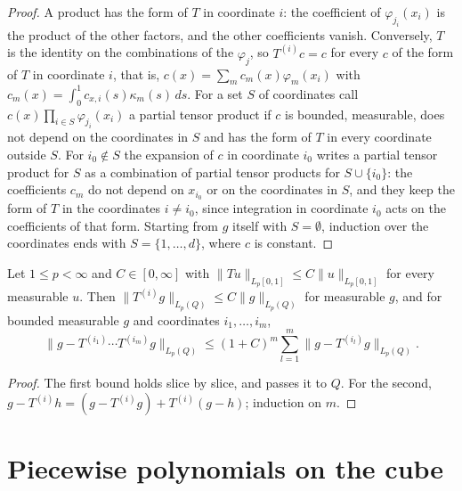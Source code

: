 \begin{proof}
\leanok
A product has the form of $T$ in coordinate $i$: the coefficient of $\varphi_{j_i}(x_i)$ is the
product of the other factors, and the other coefficients vanish. Conversely, $T$ is the identity
on the combinations of the $\varphi_j$, so $T^{(i)} c = c$ for every $c$ of the form of $T$ in
coordinate $i$, that is,
$c(x) = \sum_m c_m(x) \varphi_m(x_i)$ with $c_m(x) = \int_0^1 c_{x,i}(s) \kappa_m(s) \, ds$. For a
set $S$ of coordinates call $c(x) \prod_{i \in S} \varphi_{j_i}(x_i)$ a partial tensor product if
$c$ is bounded, measurable, does not depend on the coordinates in $S$ and has the form of $T$ in
every coordinate outside $S$. For $i_0 \notin S$ the expansion of $c$ in coordinate $i_0$ writes a
partial tensor product for $S$ as a combination of partial tensor products for $S \cup \{i_0\}$:
the coefficients $c_m$ do not depend on $x_{i_0}$ or on the coordinates in $S$, and they keep the
form of $T$ in the coordinates $i \neq i_0$, since integration in coordinate $i_0$ acts on the
coefficients of that form. Starting from $g$ itself with $S = \emptyset$, induction over the
coordinates ends with $S = \{1, \dots, d\}$, where $c$ is constant.
\end{proof}

\begin{lemma}
\label{lem:kernel-telescoping}
\leanok
{}
Let $1 \leq p < \infty$ and $C \in [0, \infty]$ with
$\|T u\|_{L_p[0,1]} \leq C \|u\|_{L_p[0,1]}$ for every measurable $u$. Then
$\|T^{(i)} g\|_{L_p(Q)} \leq C \|g\|_{L_p(Q)}$ for measurable $g$, and for bounded measurable
$g$ and coordinates $i_1, \dots, i_m$,
\[
  \bigl\| g - T^{(i_1)} \cdots T^{(i_m)} g \bigr\|_{L_p(Q)}
  \leq (1 + C)^m \sum_{l=1}^m \|g - T^{(i_l)} g\|_{L_p(Q)} .
\]
\end{lemma}

\begin{proof}
\leanok
The first bound holds slice by slice, and  passes it to $Q$. For the second,
$g - T^{(i)} h = (g - T^{(i)} g) + T^{(i)} (g - h)$; induction on $m$.
\end{proof}

\section{Piecewise polynomials on the cube}

